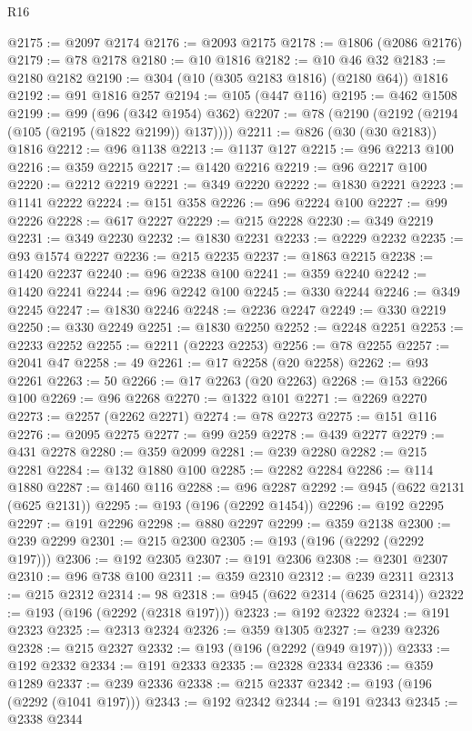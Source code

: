 \begin{lexlean}{R16}
\begin{coremodule}
@2175 := @2097 @2174
@2176 := @2093 @2175
@2178 := @1806 (@2086 @2176)
@2179 := @78 @2178
@2180 := @10 @1816
@2182 := @10 @46 @32
@2183 := @2180 @2182
@2190 := @304 (@10 (@305 @2183 @1816) (@2180 @64)) @1816
@2192 := @91 @1816 @257
@2194 := @105 (@447 @116)
@2195 := @462 @1508
@2199 := @99 (@96 (@342 @1954) @362)
@2207 := @78 (@2190 (@2192 (@2194 (@105 (@2195 (@1822 @2199)) @137))))
@2211 := @826 (@30 (@30 @2183)) @1816
@2212 := @96 @1138
@2213 := @1137 @127
@2215 := @96 @2213 @100
@2216 := @359 @2215
@2217 := @1420 @2216
@2219 := @96 @2217 @100
@2220 := @2212 @2219
@2221 := @349 @2220
@2222 := @1830 @2221
@2223 := @1141 @2222
@2224 := @151 @358
@2226 := @96 @2224 @100
@2227 := @99 @2226
@2228 := @617 @2227
@2229 := @215 @2228
@2230 := @349 @2219
@2231 := @349 @2230
@2232 := @1830 @2231
@2233 := @2229 @2232
@2235 := @93 @1574 @2227
@2236 := @215 @2235
@2237 := @1863 @2215
@2238 := @1420 @2237
@2240 := @96 @2238 @100
@2241 := @359 @2240
@2242 := @1420 @2241
@2244 := @96 @2242 @100
@2245 := @330 @2244
@2246 := @349 @2245
@2247 := @1830 @2246
@2248 := @2236 @2247
@2249 := @330 @2219
@2250 := @330 @2249
@2251 := @1830 @2250
@2252 := @2248 @2251
@2253 := @2233 @2252
@2255 := @2211 (@2223 @2253)
@2256 := @78 @2255
@2257 := @2041 @47
@2258 := 49
@2261 := @17 @2258 (@20 @2258)
@2262 := @93 @2261
@2263 := 50
@2266 := @17 @2263 (@20 @2263)
@2268 := @153 @2266 @100
@2269 := @96 @2268
@2270 := @1322 @101
@2271 := @2269 @2270
@2273 := @2257 (@2262 @2271)
@2274 := @78 @2273
@2275 := @151 @116
@2276 := @2095 @2275
@2277 := @99 @259
@2278 := @439 @2277
@2279 := @431 @2278
@2280 := @359 @2099
@2281 := @239 @2280
@2282 := @215 @2281
@2284 := @132 @1880 @100
@2285 := @2282 @2284
@2286 := @114 @1880
@2287 := @1460 @116
@2288 := @96 @2287
@2292 := @945 (@622 @2131 (@625 @2131))
@2295 := @193 (@196 (@2292 @1454))
@2296 := @192 @2295
@2297 := @191 @2296
@2298 := @880 @2297
@2299 := @359 @2138
@2300 := @239 @2299
@2301 := @215 @2300
@2305 := @193 (@196 (@2292 (@2292 @197)))
@2306 := @192 @2305
@2307 := @191 @2306
@2308 := @2301 @2307
@2310 := @96 @738 @100
@2311 := @359 @2310
@2312 := @239 @2311
@2313 := @215 @2312
@2314 := 98
@2318 := @945 (@622 @2314 (@625 @2314))
@2322 := @193 (@196 (@2292 (@2318 @197)))
@2323 := @192 @2322
@2324 := @191 @2323
@2325 := @2313 @2324
@2326 := @359 @1305
@2327 := @239 @2326
@2328 := @215 @2327
@2332 := @193 (@196 (@2292 (@949 @197)))
@2333 := @192 @2332
@2334 := @191 @2333
@2335 := @2328 @2334
@2336 := @359 @1289
@2337 := @239 @2336
@2338 := @215 @2337
@2342 := @193 (@196 (@2292 (@1041 @197)))
@2343 := @192 @2342
@2344 := @191 @2343
@2345 := @2338 @2344

\end{coremodule}
\end{lexlean}

